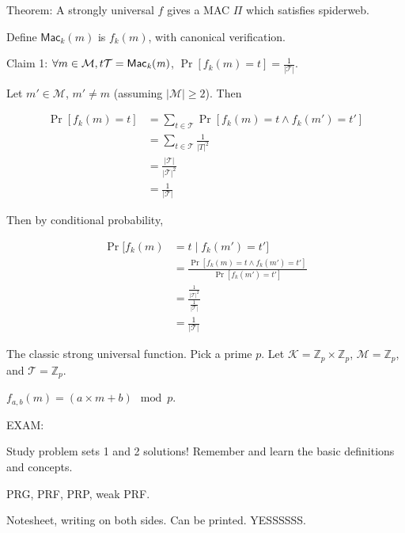 \documentclass[12pt]{article}
\newcommand{\Z}{\mathbb{Z}}
\newcommand{\KKK}{\mathcal{K}}
\newcommand{\MMM}{\mathcal{M}}
\newcommand{\TTT}{\mathcal{T}}
\newcommand{\Mac}{\mathsf{Mac}}
\begin{document}
Theorem: A strongly universal $f$ gives a MAC $\Pi$ which satisfies spiderweb.

Define $\Mac_k(m)$ is $f_k(m)$, with canonical verification.

Claim 1: $\forall m\in \MMM,t\it\TTT=\Mac_k(m)$, $\Pr[f_k(m)=t]=\frac{1}{|\TTT|}$.

Let $m'\in\MMM$, $m'\neq m$ (assuming $|\MMM|\geq 2$). Then

\begin{align*}
\Pr[f_k(m)=t]&=\sum\limits_{t\in\TTT}\Pr[f_k(m)=t\wedge f_k(m')=t']\\
&=\sum\limits_{t\in\TTT}\frac{1}{|T|^2}\\
&=\frac{|\TTT|}{|\TTT|^2}\\
&=\frac{1}{|\TTT|}
\end{align*}

Then by conditional probability,

\begin{align*}
\Pr[f_k(m)&=t\mid f_k(m')=t']\\
&=\frac{\Pr[f_k(m)=t\wedge f_k(m')=t']}{\Pr[f_k(m')=t']}\\
&=\frac{\frac{1}{|\TTT|^2}}{\frac{1}{|\TTT|}}\\
&=\frac{1}{|\TTT|}
\end{align*}

The classic strong universal function. Pick a prime $p$. Let $\KKK=\Z_p\times\Z_p$, $\MMM=\Z_p$, and $\TTT=\Z_p$.

$f_{a,b}(m)=(a\times m+b)\mod p$.

EXAM:

Study problem sets 1 and 2 solutions! Remember and learn the basic definitions and concepts.

PRG, PRF, PRP, weak PRF.

Notesheet, writing on both sides. Can be printed. YESSSSSS.
\end{document}
